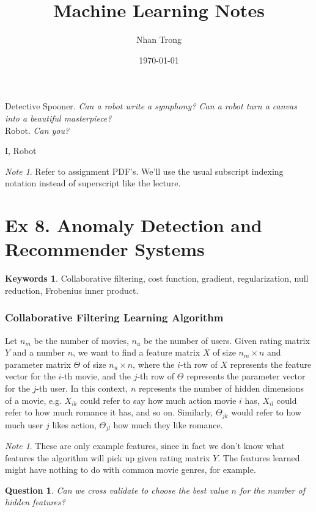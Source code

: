 \documentclass[12pt]{article}
\title{Machine Learning Notes}
\author{Nhan Trong}
\date{\today}                                           %
\theoremstyle{plain}
\newtheorem{question}[theorem]{Question}
\theoremstyle{definition}
\newtheorem*{keywords}{Keywords}
\theoremstyle{remark}
\newtheorem{note}[theorem]{Note}
\begin{document}
\maketitle

\epigraph{Detective Spooner. \textit{Can a robot write a symphony? Can a robot turn a canvas into a beautiful masterpiece?} \\ Robot. \textit{Can you?}}{I, Robot}

\begin{note}
Refer to assignment PDF's. We'll use the usual subscript indexing notation instead of superscript like the lecture.
\end{note}

\part{Ex 8. Anomaly Detection and Recommender Systems}

\begin{keywords}
Collaborative filtering, cost function, gradient, regularization, null reduction, Frobenius inner product.
\end{keywords}

\section{Collaborative Filtering Learning Algorithm}

Let $n_m$ be the number of movies, $n_u$ be the number of users. Given rating matrix $Y$ and a number $n$, we want to find a feature matrix $X$ of size $n_m \times n$ and parameter matrix $\Theta$ of size $n_u \times n$, where the $i$-th row of $X$ represents the feature vector for the $i$-th movie, and the $j$-th row of $\Theta$ represents the parameter vector for the $j$-th user. In this context, $n$ represents the number of hidden dimensions of a movie, e.g. $X_{ik}$ could refer to say how much action movie $i$ has, $X_{il}$ could refer to how much romance it has, and so on. Similarly, $\Theta_{jk}$ would refer to how much user $j$ likes action, $\Theta_{jl}$ how much they like romance.

\begin{note}
These are only example features, since in fact we don't know what features the algorithm will pick up given rating matrix $Y$. The features learned might have nothing to do with common movie genres, for example.
\end{note}

\begin{question}
Can we cross validate to choose the best value $n$ for the number of hidden features?
\end{question}
\end{document}
